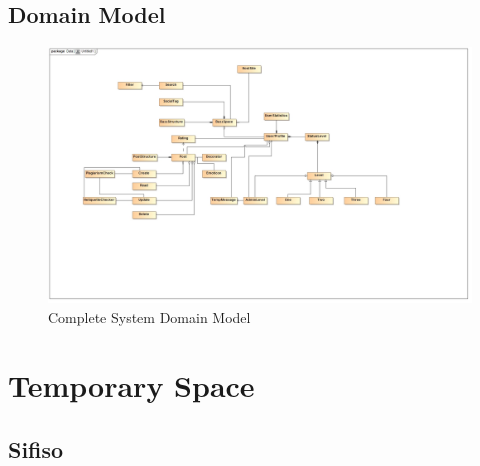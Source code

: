 \documentclass[11pt]{article}
\begin{document}
\subsection{Domain Model}
\graphicspath{ {../Diagrams/} }
	  \begin{figure}[H]	
    	\includegraphics[scale=0.32]{Domain.jpg}
    	\caption{Complete System Domain Model}
	\end{figure}

\newpage
\section{Temporary Space}

\subsection{Sifiso}
\end{document}
